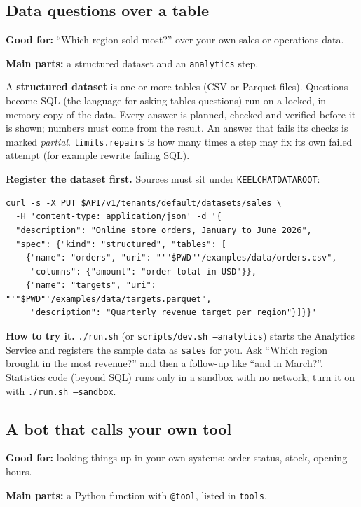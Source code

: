 \documentclass[11pt,a4paper]{article}
\newcommand{\snip}[1]{}
\newcommand{\codeus}{\textunderscore\allowbreak}
\newcommand{\code}[1]{{\renewcommand{\_}{\codeus}\texttt{\upshape #1}}}
\newcommand{\key}[1]{{\renewcommand{\_}{\codeus}\texttt{\color{ckey}#1}}}
\newcommand{\recipehead}[2]{%
  \begin{tcolorbox}[enhanced,colback=boxE,colframe=boxE,arc=2pt,left=8pt,right=8pt,top=4pt,bottom=4pt]
  \small\textbf{\color{keel}Good for:} #1\par
  \textbf{\color{keel}Main parts:} #2
  \end{tcolorbox}}
\begin{document}
\subsection{Data questions over a table}
\recipehead{``Which region sold most?'' over your own sales or operations data.}{a structured dataset and an \key{analytics} step.}

\snip{06_analytics.yaml}

A \textbf{structured dataset} is one or more tables (CSV or Parquet files). Questions become SQL (the language for
asking tables questions) run on a locked, in-memory copy of the data. Every answer is planned, checked and verified
before it is shown; numbers must come from the result. An answer that fails its checks is marked \emph{partial}.
\key{limits.repairs} is how many times a step may fix its own failed attempt (for example rewrite failing SQL).

\textbf{Register the dataset first.} Sources must sit under \code{KEELCHAT\_DATA\_ROOT}:

\begin{lstlisting}[style=bashstyle]
curl -s -X PUT $API/v1/tenants/default/datasets/sales \
  -H 'content-type: application/json' -d '{
  "description": "Online store orders, January to June 2026",
  "spec": {"kind": "structured", "tables": [
    {"name": "orders", "uri": "'"$PWD"'/examples/data/orders.csv",
     "columns": {"amount": "order total in USD"}},
    {"name": "targets", "uri": "'"$PWD"'/examples/data/targets.parquet",
     "description": "Quarterly revenue target per region"}]}}'
\end{lstlisting}

\textbf{How to try it.} \code{./run.sh} (or \code{scripts/dev.sh --analytics}) starts the Analytics Service and
registers the sample data as \code{sales} for you. Ask ``Which region brought in the most revenue?'' and then a
follow-up like ``and in March?''. Statistics code (beyond SQL) runs only in a sandbox with no network; turn it on
with \code{./run.sh --sandbox}.

\subsection{A bot that calls your own tool}\label{sec:tool}
\recipehead{looking things up in your own systems: order status, stock, opening hours.}%
{a Python function with \code{@tool}, listed in \key{tools}.}
\end{document}
